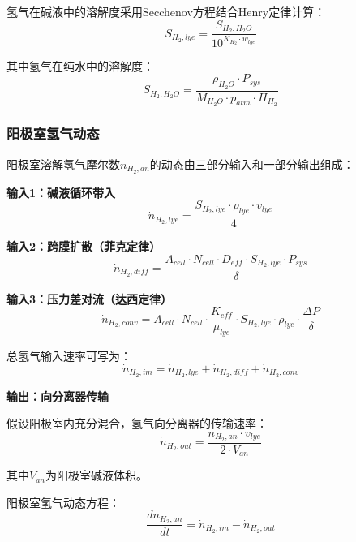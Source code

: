氢气在碱液中的溶解度采用Secchenov方程结合Henry定律计算：
\begin{equation}
  S_{H_2,lye} = \frac{S_{H_2,H_2O}}{10^{K_{H_2} \cdot w_{lye}}}
\end{equation}

其中氢气在纯水中的溶解度：
\begin{equation}
  S_{H_2,H_2O} = \frac{\rho_{H_2O} \cdot P_{sys}}{M_{H_2O} \cdot p_{atm} \cdot H_{H_2}}
\end{equation}

\subsubsection{阳极室氢气动态}

阳极室溶解氢气摩尔数$n_{H_2,an}$的动态由三部分输入和一部分输出组成：

\textbf{输入1：碱液循环带入}
\begin{equation}
  \dot{n}_{H_2,lye} = \frac{S_{H_2,lye} \cdot \rho_{lye} \cdot v_{lye}}{4}
\end{equation}

\textbf{输入2：跨膜扩散（菲克定律）}
\begin{equation}
  \dot{n}_{H_2,diff} = \frac{A_{cell} \cdot N_{cell} \cdot D_{eff} \cdot S_{H_2,lye} \cdot P_{sys}}{\delta}
\end{equation}

\textbf{输入3：压力差对流（达西定律）}
\begin{equation}
  \dot{n}_{H_2,conv} = A_{cell} \cdot N_{cell} \cdot \frac{K_{eff}}{\mu_{lye}} \cdot S_{H_2,lye} \cdot \rho_{lye} \cdot \frac{\Delta P}{\delta}
\end{equation}

总氢气输入速率可写为：
\begin{equation}
  \dot{n}_{H_2,im} = \dot{n}_{H_2,lye} + \dot{n}_{H_2,diff} + \dot{n}_{H_2,conv}
\end{equation}

\textbf{输出：向分离器传输}

假设阳极室内充分混合，氢气向分离器的传输速率：
\begin{equation}
  \dot{n}_{H_2,out} = \frac{n_{H_2,an} \cdot v_{lye}}{2 \cdot V_{an}}
\end{equation}

其中$V_{an}$为阳极室碱液体积。

阳极室氢气动态方程：
\begin{equation}
  \frac{dn_{H_2,an}}{dt} = \dot{n}_{H_2,im} - \dot{n}_{H_2,out}
\end{equation}

